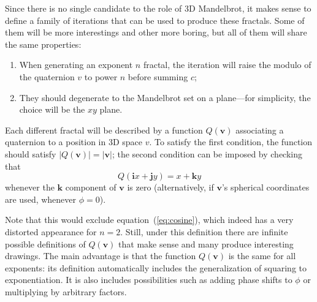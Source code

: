 \documentclass{article}
\let\vec\mathbf
\begin{document}
Since there is no single candidate to the role of 3D Mandelbrot, it
makes sense to define a family of iterations that can be used to produce
these fractals.  Some of them will be more interestings and other more
boring, but all of them will share the same properties:
\begin{enumerate}
\item When generating an exponent $n$ fractal, the iteration will
  raise the modulo of the quaternion $v$ to power $n$ before summing
  $c$;

\item\label{item:mandel-xy} They should degenerate to the Mandelbrot
  set on a plane---for simplicity, the choice will be the $xy$ plane.
\end{enumerate}

Each different fractal will be described by a function $Q(\vec{v})$
associating a quaternion to a position in 3D space $v$.  To satisfy
the first condition, the function should satisfy $|Q(\vec{v})| =
|\vec{v}|$; the second condition can be imposed by checking that
\begin{equation*}
\label{eq:its-mandel}
 Q(\vec{i}x+\vec{j}y) = x+\vec{k}y
\end{equation*}
\noindent
whenever the $\vec{k}$ component of $\vec{v}$ is zero (alternatively,
if $\vec{v}$'s spherical coordinates are used, whenever $\phi = 0$).

Note that this would exclude equation~(\ref{eq:cosine}), which indeed
has a very distorted appearance for $n=2$.  Still, under this definition
there are infinite possible definitions of $Q(\vec{v})$ that make sense
and many produce interesting drawings.  The main advantage is that the
function $Q(\vec{v})$ is the same for all exponents: its definition
automatically includes the generalization of squaring to exponentiation.
It is also includes possibilities such as adding phase shifts to $\phi$
or multiplying by arbitrary factors.
\end{document}
